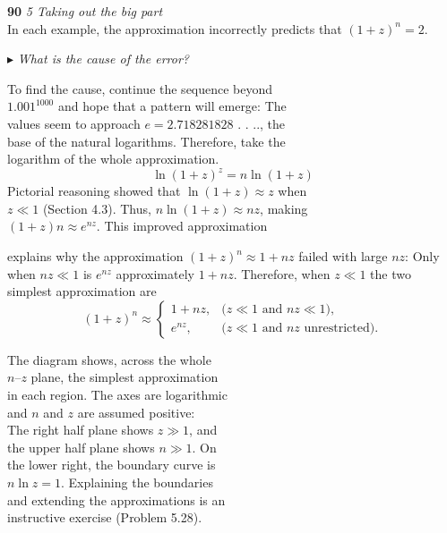 \documentclass{book}
\begin{document}

\newpage


\large\textbf{90} \hfill \textit{5 Taking out the big part} \\

\Large\noindent In each example, the approximation incorrectly predicts that $(1 + z)^n = 2$.\par\medskip
$\blacktriangleright$ \textit{What is the cause of the error?}\par\medskip
\begin{minipage}{\textwidth}
 \Large\noindent  To find the cause, continue the sequence beyond\\
$1.001^{1000}$ and hope that a pattern will emerge: The\\
values seem to approach $e = 2.718281828$ . . .., the\\
base of the natural logarithms. Therefore, take the\\
logarithm of the whole approximation.\\
\begin{equation}
\ln{(1+z)^z}=n\ln{(1+z)}
\end{equation}
Pictorial reasoning showed that $\ln{(1 + z)}\approx {z}$ when\\
$z \ll 1$ (Section 4.3). Thus, $n \ln{(1 + z)}\approx {nz}$, making\\
$(1 + z)n\approx {e^{nz}}$. This improved approximation\\ 
\end{minipage} 
\Large\textrm{explains why the approximation $(1 + z)^n\approx 1 + nz$ failed with large $nz$:
Only when $nz \ll 1$ is $e^{nz}$ approximately $1 + nz$. Therefore, when $z \ll 1$
the two simplest approximation are}
\begin{equation}
(1 + z)^n \approx
\begin{cases}
1+nz, & \text{($z\ll  1$ and $nz\ll 1$),} \\
e^{nz}, & \text{($z\ll 1$ and $nz$ unrestricted).}
\end{cases}
\end{equation}
\begin{minipage}{\textwidth}
\noindent The diagram shows, across the whole\\
$n$--$z$ plane, the simplest approximation\\
in each region. The axes are logarithmic\\
and $n$ and $z$ are assumed positive:\\
The right half plane shows $z\gg 1$, and\\
the upper half plane shows $n\gg 1$. On\\
the lower right, the boundary curve is\\
$n \ln{z} = 1$. Explaining the boundaries\\
and extending the approximations is an\\
instructive exercise (Problem 5.28).\\
\end{minipage}\par\medskip
\end{document}
